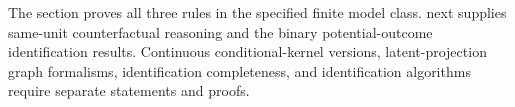 The section proves all three rules in the specified finite model class.
 next supplies same-unit counterfactual
reasoning and the binary potential-outcome identification results.
Continuous conditional-kernel versions, latent-projection graph
formalisms, identification completeness, and identification algorithms
require separate statements and proofs.
